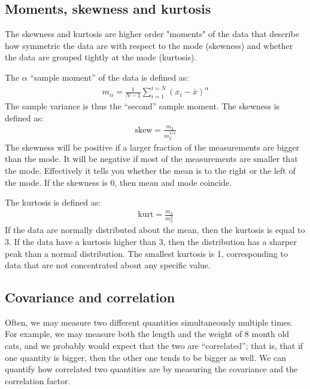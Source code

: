 \subsection{Moments, skewness and kurtosis}

The skewness and kurtosis are higher order "moments" of the data that describe how symmetric the data are with respect to the mode (skewness) and whether the data are grouped tightly at the mode (kurtosis).

The $\alpha$ ``sample moment'' of the data is defined as:
\begin{align}
 m_\alpha=\frac{1}{N-1} \sum_{i=1}^{i=N} (x_i-\bar{x})^\alpha 
\end{align}
The sample variance is thus the ``second'' sample moment. The skewness is defined as:
\begin{align}
 \text{skew} = \frac{m_3}{m_2^{3/2}} 
\end{align}
The skewness will be positive if a larger fraction of the measurements are bigger than the mode. It will be negative if most of the measurements are smaller that the mode. Effectively it tells you whether the mean is to the right or the left of the mode. If the skewness is 0, then mean and mode coincide.

The kurtosis is defined as:
\begin{align}
  \text{kurt}  =\frac{m_4}{m_2^{2}} 
\end{align}
If the data are normally distributed about the mean, then the kurtosis is equal to 3. If the data have a kurtosis higher than 3, then the distribution has a sharper peak than a normal distribution. The smallest kurtosis is 1, corresponding to data that are not concentrated about any specific value.

\subsection{Covariance and correlation}
Often, we may measure two different quantities simultaneously multiple times. For example, we may measure both the length and the weight of 8 month old cats, and we probably would expect that the two are ``correlated''; that is, that if one quantity is bigger, then the other one tends to be bigger as well. We can quantify how correlated two quantities are by measuring the covariance and the correlation factor. 


